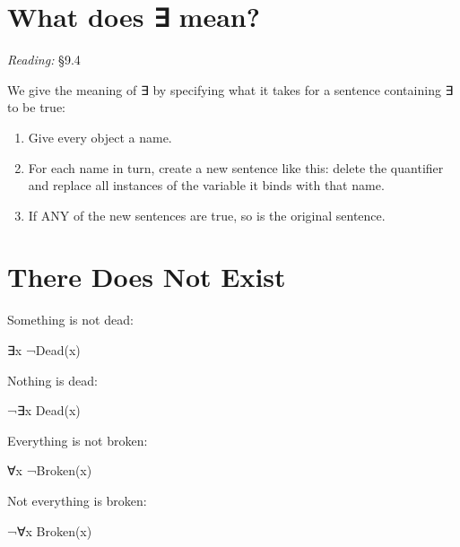 \documentclass[12pt]{extarticle}
\begin{document}
\begin{multicols*}{3}
 
\section{What does ∃ mean?}
 
\emph{Reading:} §9.4
 
We give the meaning of ∃ by specifying what it takes for a sentence containing ∃ to be true:
 
\begin{enumerate}
 
\item Give every object a name.
 
\item For each name in turn, create a new sentence like this: delete the quantifier and replace all instances of the variable it binds with that name.
 
\item If ANY of the new sentences are true, so is the original sentence.
 
\end{enumerate}
 
 
 
\section{There Does Not Exist}
 
Something is not dead:
 
\hspace{3mm} ∃x ¬Dead(x)
 
Nothing is dead:
 
\hspace{3mm} ¬∃x Dead(x)
 
Everything is not broken:
 
\hspace{3mm} ∀x ¬Broken(x)
 
Not everything is broken:
 
\hspace{3mm} ¬∀x Broken(x)
 

\end{multicols*}
\end{document}
